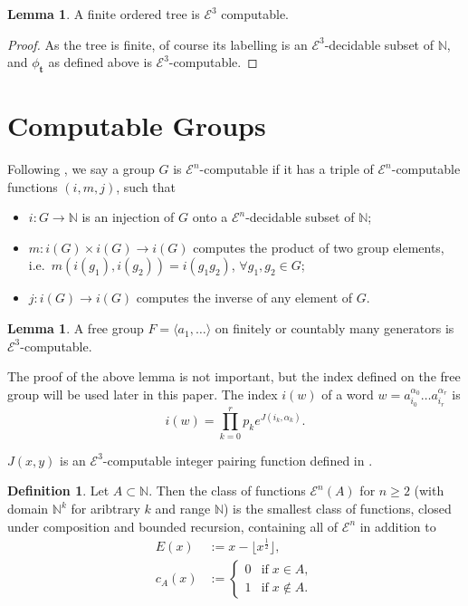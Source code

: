 \documentclass[a4paper]{article}
\newcommand{\grz}[1]{$\mathcal{E}^{#1}$}	%
\newcommand{\NN}{\mathbb{N}}	%
\newcommand{\tvec}{\mathbf{t}}	%
\theoremstyle{plain}
\theoremstyle{definition}
\newtheorem{lemma}[theorem]{Lemma}
\newtheorem{definition}[theorem]{Definition}
\begin{document}
\begin{lemma}
A finite ordered tree is \grz{3} computable.
\end{lemma}

\begin{proof}
As the tree is finite, of course its labelling is an \grz{3}-decidable subset of $\NN$, and $\phi_{\tvec}$ as defined above is \grz{3}-computable.
\end{proof}

\section{Computable Groups \label{groups}}

Following \cite{Cannonito_1966}, we say a group $G$ is \grz{n}-computable if it has a triple of \grz{n}-computable functions $(i,m,j)$, such that

\begin{itemize}
	\item $i: G \rightarrow \NN$ is an injection of $G$ onto a \grz{n}-decidable subset of $\NN$;
	\item $m: i(G) \times i(G) \rightarrow i(G)$ computes the product of two group elements, i.e.\ $m \left(i(g_1),i(g_2)\right) = i(g_1g_2)$, $\forall g_1,g_2 \in G$;
	\item $j: i(G) \rightarrow i(G)$ computes the inverse of any element of $G$.
\end{itemize}

\begin{lemma}\cite[3.1]{Cannonito_1973}
	A free group $F = \langle a_1, \dots \rangle$ on finitely or countably many generators is \grz{3}-computable.
\end{lemma}

The proof of the above lemma is not important, but the index defined on the free group will be used later in this paper. The index $i(w)$ of a word $w = a_{i_0}^{\alpha_0} \dots a_{i_r}^{\alpha_r}$ is
\[ i(w) = \prod_{k=0}^r p_k e^{J(i_k,\alpha_k)}. \]

$J(x,y)$ is an \grz{3}-computable integer pairing function defined in \cite{Cannonito_1973}.


\begin{definition} \cite[2.3]{Cannonito_1973}
	Let $A \subset \NN$. Then the class of functions \grz{n}$(A)$ for $n \geq 2$ (with domain $\NN^k$ for aribtrary $k$ and range $\NN$) is the smallest class of functions, closed under composition and bounded recursion, containing all of \grz{n} in addition to 
	\begin{align}
		E(x) &:= x - \lfloor x^{\frac{1}{2}} \rfloor, \\
		c_A(x) &:= \begin{cases}
									0 & \textrm{if}\; x \in A, \\
									1 & \textrm{if}\;  x \notin A.
							\end{cases}
	\end{align}
\end{definition}
 
\end{document}
